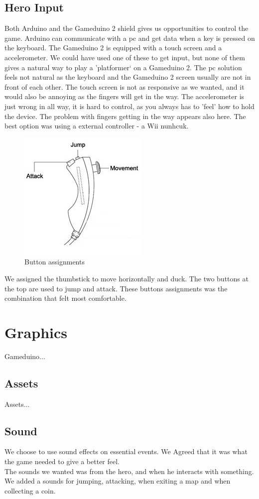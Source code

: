 \subsection{Hero Input}
Both Arduino and the Gameduino 2 shield gives us opportunities to control the game.
Arduino can communicate with a pc and get data when a key is pressed on the keyboard.
The Gameduino 2 is equipped with a touch screen and a accelerometer. We could have used
one of these to get input, but none of them
gives a natural way to play a 'platformer` on a Gameduino 2. The pc solution
feels not natural as the keyboard and the Gameduino 2 screen usually are not in front of each other. The touch screen is not as responsive as we wanted, and it would also be annoying
as the fingers will get in the way. The accelerometer is just wrong in all way, it is hard
to control, as you always has to 'feel' how to hold the device. The problem with fingers
getting in the way appears also here. The best option was using a external controller - a Wii nunhcuk.

\begin{figure}[h] 
  \centering 
  \includegraphics[scale=0.6]{Figures/nunchuk}
  \caption{Button assignments}
  \label{fig:Nunchuk} 
\end{figure}

We assigned the thumbstick to move horizontally and duck. The two buttons at the top are used to jump
and attack. These buttons assignments was the combination that felt most comfortable.

\section{Graphics}
Gameduino...

\subsection{Assets}
Assets...

\subsection{Sound} %
We choose to use sound effects on essential events.
We Agreed that it was what the game needed to give a better feel.\\
The sounds we wanted was from the hero, and when he interacts with something.
We added a sounds for jumping, attacking, when exiting a map and when collecting a coin.\\
